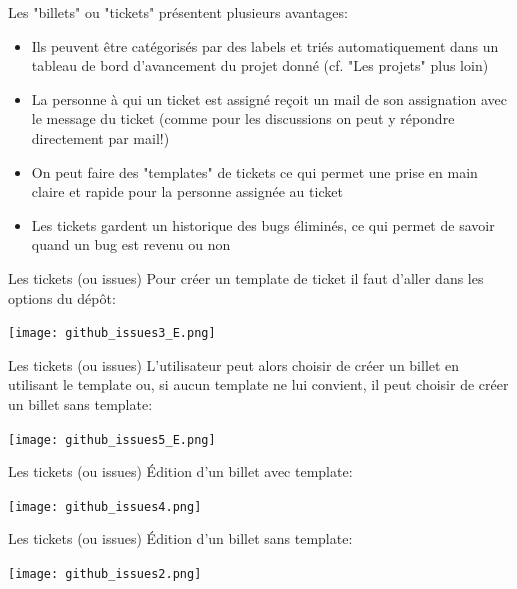 \documentclass{beamer}
\begin{document}
\begin{frame}
Les "billets" ou "tickets" présentent plusieurs avantages:
\smallskip
\begin{itemize}
	\item Ils peuvent être catégorisés par des labels et triés automatiquement dans un  
	      tableau de bord d'avancement du projet donné (cf. "Les projets" plus loin)
	\item La personne à qui un ticket est assigné reçoit un mail de son assignation   	          avec le message du ticket (comme pour les discussions on peut y répondre   
	      directement par mail!)
	\item On peut faire des "templates" de tickets ce qui permet une prise en main  
	      claire et rapide pour la personne assignée au ticket
	\item Les tickets gardent un historique des bugs éliminés, ce qui 
	      permet de savoir quand un bug est revenu ou non
\end{itemize}
\end{frame}

\begin{frame}{Les tickets (ou issues)}
Pour créer un template de ticket il faut d'aller dans les options du dépôt:
\begin{center}
	\texttt{[image: github\_issues3\_E.png]}
\end{center}
\end{frame}


\begin{frame}{Les tickets (ou issues)}
L'utilisateur peut alors choisir de créer un billet en utilisant le template ou, si aucun template ne lui convient, il peut choisir de créer un billet sans template:
\begin{center}
	\texttt{[image: github\_issues5\_E.png]}
\end{center}
\end{frame}

\begin{frame}{Les tickets (ou issues)}
Édition d'un billet avec template:
\begin{center}
	\texttt{[image: github\_issues4.png]}
\end{center}
\end{frame}

\begin{frame}{Les tickets (ou issues)}
Édition d'un billet sans template:
\begin{center}
	\texttt{[image: github\_issues2.png]}
\end{center}
\end{frame}
\end{document}
